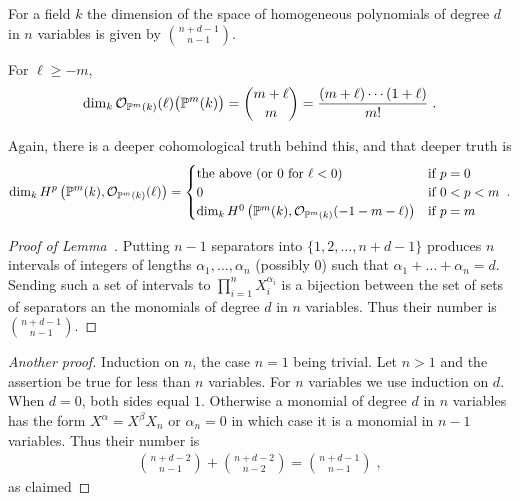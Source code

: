 \documentclass[a4paper,parskip=half,numbers=enddot, DIV=12, headheight=30pt]{scrreprt}
\begin{document}
\begin{lem}
    For a field $k$ the dimension of the space of homogeneous polynomials of degree $d$ in $n$ variables is given by $\binom{n+d-1}{n-1}$.
\end{lem}
\begin{cor}
	For $\ell\geq -m$,
    \begin{align*}
        \dim_k\mathcal{O}_{\mathbb{P}^m(k)}(\ell)\big(\mathbb{P}^m(k)\big) = \binom{m+\ell}{m} = \frac{(m+\ell)\cdots (1+\ell)}{m!}\;.
    \end{align*}
\end{cor}
\begin{rem*}
	Again, there is a deeper cohomological truth behind this, and that deeper truth is
	\begin{align*}
		\dim_kH^p\left(\mathbb{P}^m(k),\mathcal{O}_{\mathbb{P}^m(k)}(\ell)\right)=
		\begin{cases}
			\text{the above (or $0$ for $\ell<0$)} & \text{if }p=0\\
			0 & \text{if }0<p<m\\
			\dim_kH^0\left(\mathbb{P}^m(k),\mathcal{O}_{\mathbb{P}^m(k)}(-1-m-\ell)\right) & \text{if }p=m
		\end{cases}\;.
	\end{align*}
\end{rem*}
\begin{proof}[Proof of Lemma~]
    Putting $n-1$ separators into $\{1,2,\ldots,n+d-1\}$ produces $n$ intervals of integers of lengths $\alpha_1,\ldots,\alpha_n$ (possibly $0$) such that $\alpha_1+\ldots+\alpha_n=d$. Sending such a set of intervals to $\prod_{i=1}^n X_i^{\alpha_i}$ is a bijection between the set of sets of separators an the monomials of degree $d$ in $n$ variables. Thus their number is $\binom{n+d-1}{n-1}$.
\end{proof}
\begin{proof}[Another proof]
    Induction on $n$, the case $n=1$ being trivial. Let $n>1$ and the assertion be true for less than $n$ variables. For $n$ variables we use induction on $d$. When $d=0$, both sides equal $1$. Otherwise a monomial of degree $d$ in $n$ variables has the form $X^\alpha = X^\beta X_n$ or $\alpha_n= 0$ in which case it is a monomial in $n-1$ variables. Thus their number is 
    \begin{align*}
         \binom{n+d-2}{n-1} +\binom{n+d-2}{n-2} = \binom{n+d-1}{n-1}\;,
    \end{align*}
    as claimed
\end{proof}
\end{document}
